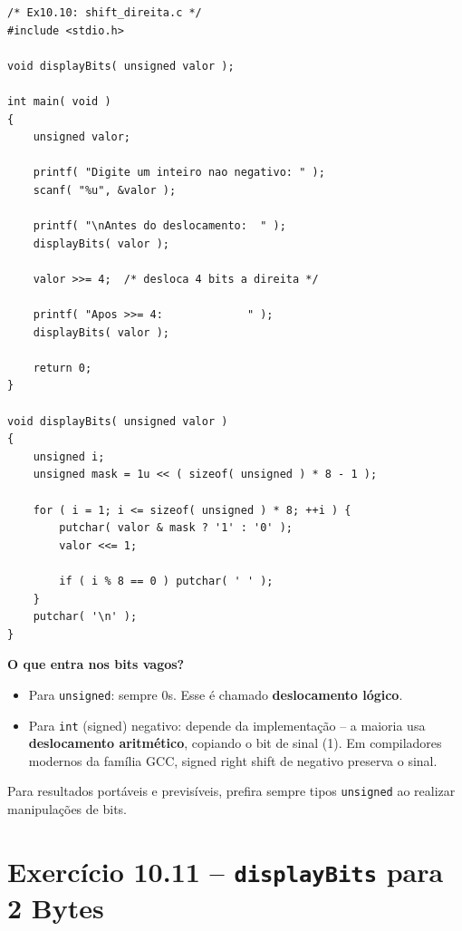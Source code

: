\documentclass[12pt,a4paper]{article}
\begin{document}
\begin{respostabox}
\begin{lstlisting}
/* Ex10.10: shift_direita.c */
#include <stdio.h>

void displayBits( unsigned valor );

int main( void )
{
    unsigned valor;

    printf( "Digite um inteiro nao negativo: " );
    scanf( "%u", &valor );

    printf( "\nAntes do deslocamento:  " );
    displayBits( valor );

    valor >>= 4;  /* desloca 4 bits a direita */

    printf( "Apos >>= 4:             " );
    displayBits( valor );

    return 0;
}

void displayBits( unsigned valor )
{
    unsigned i;
    unsigned mask = 1u << ( sizeof( unsigned ) * 8 - 1 );

    for ( i = 1; i <= sizeof( unsigned ) * 8; ++i ) {
        putchar( valor & mask ? '1' : '0' );
        valor <<= 1;

        if ( i % 8 == 0 ) putchar( ' ' );
    }
    putchar( '\n' );
}
\end{lstlisting}

\textbf{O que entra nos bits vagos?}
\begin{itemize}[noitemsep]
  \item Para \texttt{unsigned}: sempre 0s. Esse é chamado \textbf{deslocamento lógico}.
  \item Para \texttt{int} (signed) negativo: depende da implementação -- a maioria
  usa \textbf{deslocamento aritmético}, copiando o bit de sinal (1). Em compiladores
  modernos da família GCC, signed right shift de negativo preserva o sinal.
\end{itemize}

\begin{boaprática}
  Para resultados portáveis e previsíveis, prefira sempre tipos \texttt{unsigned}
  ao realizar manipulações de bits.
\end{boaprática}
\end{respostabox}

\newpage

\section{Exercício 10.11 -- \texttt{displayBits} para 2 Bytes}
\end{document}
